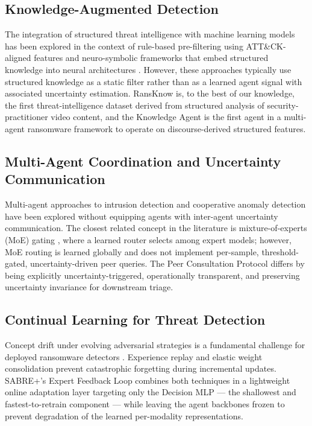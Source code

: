 \subsection{Knowledge-Augmented Detection}

The integration of structured threat intelligence with machine learning models has been explored in the context of rule-based pre-filtering using ATT\&CK-aligned features \cite{razaulla2023age} and neuro-symbolic frameworks that embed structured knowledge into neural architectures \cite{Besold2021neurosymbolicsurvey}. However, these approaches typically use structured knowledge as a static filter rather than as a learned agent signal with associated uncertainty estimation. RansKnow is, to the best of our knowledge, the first threat-intelligence dataset derived from structured analysis of security-practitioner video content, and the Knowledge Agent is the first agent in a multi-agent ransomware framework to operate on discourse-derived structured features.

\subsection{Multi-Agent Coordination and Uncertainty Communication}

Multi-agent approaches to intrusion detection \cite{MultiAgentAdaptiveDetection2023} and cooperative anomaly detection have been explored without equipping agents with inter-agent uncertainty communication. The closest related concept in the literature is mixture-of-experts (MoE) gating \cite{vaswani2017attention}, where a learned router selects among expert models; however, MoE routing is learned globally and does not implement per-sample, threshold-gated, uncertainty-driven peer queries. The Peer Consultation Protocol differs by being explicitly uncertainty-triggered, operationally transparent, and preserving uncertainty invariance for downstream triage.

\subsection{Continual Learning for Threat Detection}

Concept drift under evolving adversarial strategies is a fundamental challenge for deployed ransomware detectors \cite{Ceschin2022ConceptDrift}. Experience replay \cite{rolnick2019experience} and elastic weight consolidation prevent catastrophic forgetting during incremental updates. SABRE+'s Expert Feedback Loop combines both techniques in a lightweight online adaptation layer targeting only the Decision MLP — the shallowest and fastest-to-retrain component — while leaving the agent backbones frozen to prevent degradation of the learned per-modality representations.

